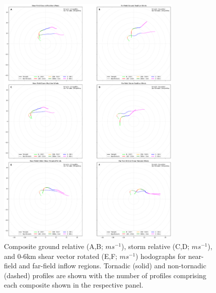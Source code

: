 \begin{figure}[h!]
    \centering
    \includegraphics[width = 0.8\textwidth]{Figures/inflow_hodos_tor_no_neg.png}
    \caption{Composite ground relative (A,B; $ms^{-1}$), storm relative (C,D; $ms^{-1}$), and 0-6km shear vector rotated (E,F; $ms^{-1}$) hodographs for near-field and far-field inflow regions. Tornadic (solid) and non-tornadic (dashed) profiles are shown with the number of profiles comprising each composite shown in the respective panel.}
    \label{fig:inflow_hodos}
\end{figure}